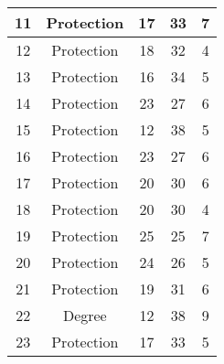 \documentclass[results.tex]{subfiles}
\begin{document}
\begin{center}
\begin{tabular}{| c || c | c | c | c |}
            \hline
            11                      & Protection                   & 17                     & 33                      & 7                    \\
            \hline
            12                      & Protection                   & 18                     & 32                      & 4                    \\
            \hline
            13                      & Protection                   & 16                     & 34                      & 5                    \\
            \hline
            14                      & Protection                   & 23                     & 27                      & 6                    \\
            \hline
            15                      & Protection                   & 12                     & 38                      & 5                    \\
            \hline
            16                      & Protection                   & 23                     & 27                      & 6                    \\
            \hline
            17                      & Protection                   & 20                     & 30                      & 6                    \\
            \hline
            18                      & Protection                   & 20                     & 30                      & 4                    \\
            \hline
            19                      & Protection                   & 25                     & 25                      & 7                    \\
            \hline
            20                      & Protection                   & 24                     & 26                      & 5                    \\
            \hline
            21                      & Protection                   & 19                     & 31                      & 6                    \\
            \hline
            22                      & Degree                       & 12                     & 38                      & 9                    \\
            \hline
            23                      & Protection                   & 17                     & 33                      & 5                    \\

\end{tabular}
\end{center}
\end{document}
